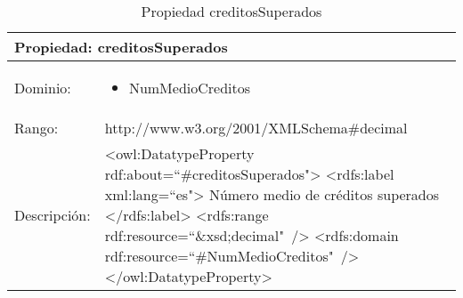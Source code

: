 \begin{table}[!ht]
	\centering
	\begin{tabular}{|p{}|p{}|}
		\hline
		\multicolumn{2}{|l|}{Propiedad: \textbf{creditosSuperados}}
		\\ \hline
		Dominio:&
		\begin{itemize}
			\item NumMedioCreditos
		\end{itemize}
		\\ \hline
		Rango:&
		http://www.w3.org/2001/XMLSchema\#decimal
		\\ \hline
		Descripción:&
		\textless owl:DatatypeProperty rdf:about=``\#creditosSuperados"\textgreater\newline 
		\tab\textless rdfs:label xml:lang=``es"\textgreater\newline
		\tab\tab Número medio de créditos superados\newline
		\tab\textless /rdfs:label\textgreater\newline
		\tab\textless rdfs:range\newline
		\tab\tab rdf:resource=``\&xsd;decimal"\ /\textgreater\newline
		\tab\textless rdfs:domain\newline
		\tab\tab rdf:resource=``\#NumMedioCreditos"\ /\textgreater\newline
		\textless /owl:DatatypeProperty\textgreater
		\\ \hline
	\end{tabular}
	\caption{Propiedad creditosSuperados}
	\label{propiedad-creditossuperados}
\end{table}

